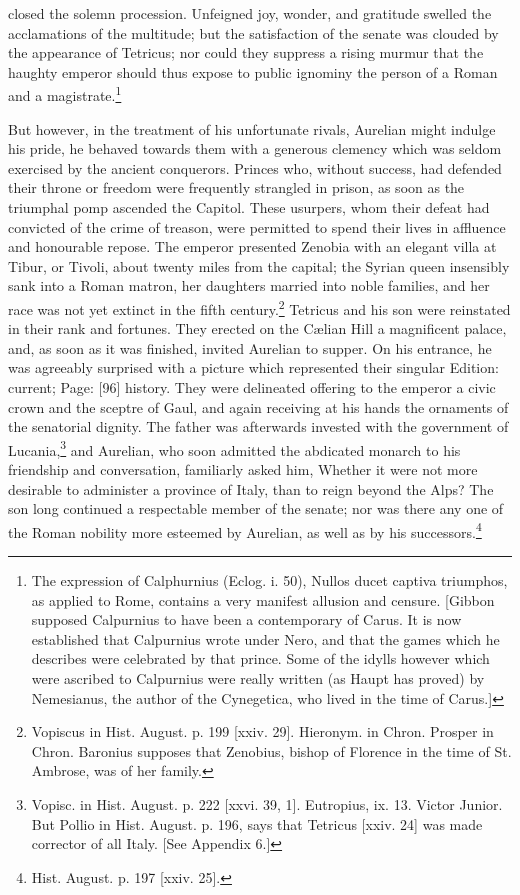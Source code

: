 closed the solemn procession. Unfeigned joy, wonder, and gratitude swelled the acclamations of the multitude; but the satisfaction of the senate was clouded by the appearance of Tetricus; nor could they suppress a rising murmur that the haughty emperor should thus expose to public ignominy the person of a Roman and a magistrate.\footnote{The expression of Calphurnius (Eclog. i. 50), Nullos ducet captiva triumphos, as applied to Rome, contains a very manifest allusion and censure. [Gibbon supposed Calpurnius to have been a contemporary of Carus. It is now established that Calpurnius wrote under Nero, and that the games which he describes were celebrated by that prince. Some of the idylls however which were ascribed to Calpurnius were really written (as Haupt has proved) by Nemesianus, the author of the Cynegetica, who lived in the time of Carus.]}

But however, in the treatment of his unfortunate rivals, Aurelian might indulge his pride, he behaved towards them with a generous clemency which was seldom exercised by the ancient conquerors. Princes who, without success, had defended their throne or freedom were frequently strangled in prison, as soon as the triumphal pomp ascended the Capitol. These usurpers, whom their defeat had convicted of the crime of treason, were permitted to spend their lives in affluence and honourable repose. The emperor presented Zenobia with an elegant villa at Tibur, or Tivoli, about twenty miles from the capital; the Syrian queen insensibly sank into a Roman matron, her daughters married into noble families, and her race was not yet extinct in the fifth century.\footnote{Vopiscus in Hist. August. p. 199 [xxiv. 29]. Hieronym. in Chron. Prosper in Chron. Baronius supposes that Zenobius, bishop of Florence in the time of St. Ambrose, was of her family.} Tetricus and his son were reinstated in their rank and fortunes. They erected on the Cælian Hill a magnificent palace, and, as soon as it was finished, invited Aurelian to supper. On his entrance, he was agreeably surprised with a picture which represented their singular Edition: current; Page: [96] history. They were delineated offering to the emperor a civic crown and the sceptre of Gaul, and again receiving at his hands the ornaments of the senatorial dignity. The father was afterwards invested with the government of Lucania,\footnote{Vopisc. in Hist. August. p. 222 [xxvi. 39, 1]. Eutropius, ix. 13. Victor Junior. But Pollio in Hist. August. p. 196, says that Tetricus [xxiv. 24] was made corrector of all Italy. [See Appendix 6.]} and Aurelian, who soon admitted the abdicated monarch to his friendship and conversation, familiarly asked him, Whether it were not more desirable to administer a province of Italy, than to reign beyond the Alps? The son long continued a respectable member of the senate; nor was there any one of the Roman nobility more esteemed by Aurelian, as well as by his successors.\footnote{Hist. August. p. 197 [xxiv. 25].}

